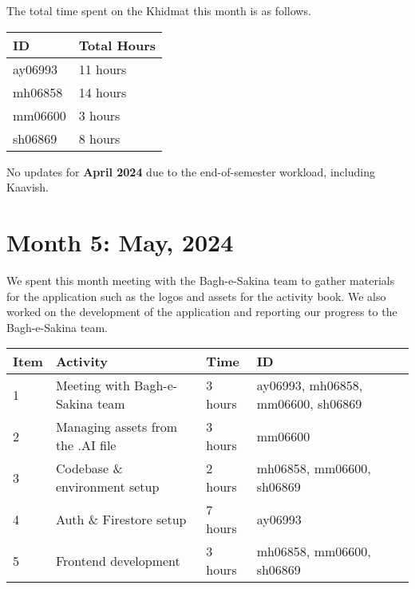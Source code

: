 \documentclass{article}
\begin{document}
\vspace{1em}

\noindent The total time spent on the Khidmat this month is as follows.

\vspace{1em}

\noindent \begin{tabular}{|l|l|} \hline
  ID & Total Hours \\ \hline
  ay06993 & 11 hours \\ \hline
  mh06858 & 14 hours \\ \hline
  mm06600 & 3 hours \\ \hline
  sh06869 & 8 hours \\ \hline
\end{tabular}

\newpage %
\noindent * No updates for \textbf{April 2024} due to the end-of-semester workload, including Kaavish.
\section*{Month 5: May, 2024}

We spent this month meeting with the Bagh-e-Sakina team to gather materials for the application such as the logos and assets for the activity book. We also worked on the development of the application and reporting our progress to the Bagh-e-Sakina team. 

\vspace{1em}

\noindent \begin{tabular}{|l|l|l|l|}
  \hline
  Item & Activity & Time   & ID \\ \hline
  1 & Meeting with Bagh-e-Sakina team & 3 hours & ay06993, mh06858, mm06600, sh06869 \\ \hline
  2 & Managing assets from the .AI file & 3 hours & mm06600 \\ \hline
  3 & Codebase \& environment setup & 2 hours  & mh06858, mm06600, sh06869 \\ \hline
  4 & Auth \& Firestore setup & 7 hours & ay06993 \\ \hline
  5 & Frontend development & 3 hours & mh06858, mm06600, sh06869 \\ \hline
\end{tabular}

\vspace{1em}
\end{document}
